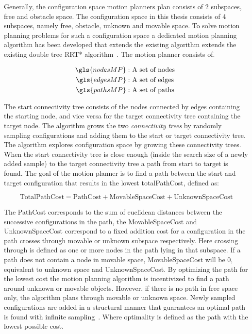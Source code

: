\textit{}\bs

Generally, the configuration space motion planners plan consists of 2 subspaces, free and obstacle space. The configuration space in this thesis consists of 4 subspaces, namely free, obstacle, unknown and movable space. To solve motion planning problems for such a configuration space a dedicated motion planning algorithm has been developed that extends the existing algorithm extends the existing double tree \ac{RRT*} algorithm~\cite{chen_fast_2018}. The motion planner consists of.

\begin{center}
\begin{align*}
  \gls{nodesMP}:& \textrm{ A set of nodes }\\
  \gls{edgesMP}:& \textrm{ A set of edges }\\
  \gls{pathsMP}:& \textrm{ A set of paths }
\end{align*}
\end{center}

The start connectivity tree consists of the nodes connected by edges containing the starting node, and vice versa for the target connectivity tree containing the target node. The algorithm grows the two \textit{connectivity trees} by randomly sampling configurations and adding them to the start or target connectivity tree. The algorithm explores configuration space by growing these connectivity trees. When the start connectivity tree is close enough (inside the search size of a newly added sample) to the target connectivity tree a path from start to target is found. The goal of the motion planner is to find a path between the start and target configuration that results in the lowest totalPathCost, defined as:

\[\textrm{TotalPathCost} = \textrm{PathCost} + \textrm{MovableSpaceCost} + \textrm{UnknownSpaceCost}\]

The PathCost corresponds to the sum of euclidean distances between the successive configurations in the path, the MovableSpaceCost and UnknownSpaceCost correspond to a fixed addition cost for a configuration in the path crosses through movable or unknown subspace respectively. Here crossing through is defined as one or more nodes in the path lying in that subspace. If a path does not contain a node in movable space, MovableSpaceCost will be 0, equivalent to unknown space and UnknownSpaceCost. By optimizing the path for the lowest cost the motion planning algorithm is incentivized to find a path around unknown or movable objects. However, if there is no path in free space only, the algorithm plans through movable or unknown space. Newly sampled configurations are added in a structural manner that guarantees an optimal path is found with infinite sampling~\cite{chen_fast_2018}. Where optimality is defined as the path with the lowest possible cost.\bs

